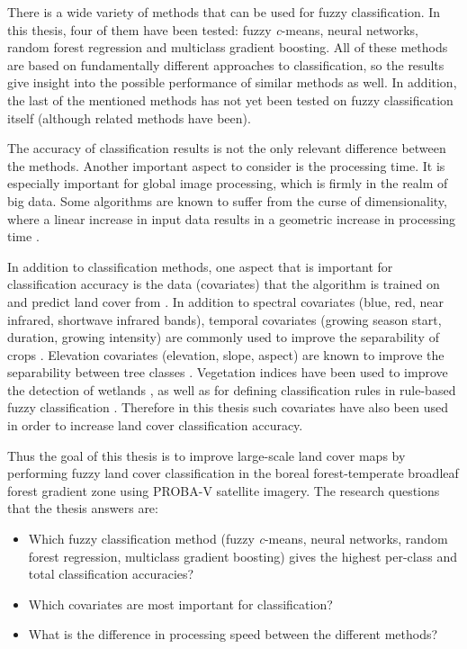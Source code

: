 \documentclass[a4paper,10pt]{book}
\begin{document}
There is a wide variety of methods that can be used for fuzzy classification. In this thesis, four of them have been tested: fuzzy \textit{c}-means, neural networks, random forest regression and multiclass gradient boosting. All of these methods are based on fundamentally different approaches to classification, so the results give insight into the possible performance of similar methods as well. In addition, the last of the mentioned methods has not yet been tested on fuzzy classification itself (although related methods have been).

The accuracy of classification results is not the only relevant difference between the methods. Another important aspect to consider is the processing time. It is especially important for global image processing, which is firmly in the realm of big data. Some algorithms are known to suffer from the curse of dimensionality, where a linear increase in input data results in a geometric increase in processing time \citep{walton2008subpixelrf}.

In addition to classification methods, one aspect that is important for classification accuracy is the data (covariates) that the algorithm is trained on and predict land cover from \citep{yu2014metadiscoveries}. In addition to spectral covariates (blue, red, near infrared, shortwave infrared bands), temporal covariates (growing season start, duration, growing intensity) are commonly used to improve the separability of crops \citep{jakubauskas2001harmonic}. Elevation covariates (elevation, slope, aspect) are known to improve the separability between tree classes \citep{burrough2001fuzzy}. Vegetation indices have been used to improve the detection of wetlands \citep{sader1995wetlands}, as well as for defining classification rules in rule-based fuzzy classification \citep{baraldi2006rulebased}. Therefore in this thesis such covariates have also been used in order to increase land cover classification accuracy.

Thus the goal of this thesis is to improve large-scale land cover maps by performing fuzzy land cover classification in the boreal forest-temperate broadleaf forest gradient zone using PROBA-V satellite imagery. The research questions that the thesis answers are:

\begin{itemize}
 \item Which fuzzy classification method (fuzzy \textit{c}-means, neural networks, random forest regression, multiclass gradient boosting) gives the highest per-class and total classification accuracies?
 \item Which covariates are most important for classification?
 \item What is the difference in processing speed between the different methods?
\end{itemize}
\end{document}
